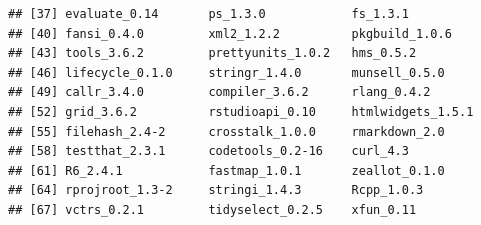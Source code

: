 \documentclass[]{article}
\begin{document}
\begin{verbatim}
## [37] evaluate_0.14       ps_1.3.0            fs_1.3.1           
## [40] fansi_0.4.0         xml2_1.2.2          pkgbuild_1.0.6     
## [43] tools_3.6.2         prettyunits_1.0.2   hms_0.5.2          
## [46] lifecycle_0.1.0     stringr_1.4.0       munsell_0.5.0      
## [49] callr_3.4.0         compiler_3.6.2      rlang_0.4.2        
## [52] grid_3.6.2          rstudioapi_0.10     htmlwidgets_1.5.1  
## [55] filehash_2.4-2      crosstalk_1.0.0     rmarkdown_2.0      
## [58] testthat_2.3.1      codetools_0.2-16    curl_4.3           
## [61] R6_2.4.1            fastmap_1.0.1       zeallot_0.1.0      
## [64] rprojroot_1.3-2     stringi_1.4.3       Rcpp_1.0.3         
## [67] vctrs_0.2.1         tidyselect_0.2.5    xfun_0.11
\end{verbatim}
\end{document}
